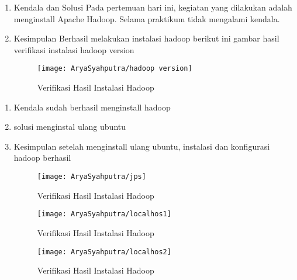 
\begin{enumerate}
\item Kendala dan Solusi
Pada pertemuan hari ini, kegiatan yang dilakukan adalah menginstall Apache Hadoop. Selama praktikum tidak mengalami kendala.

\item Kesimpulan
Berhasil melakukan instalasi hadoop berikut ini gambar hasil verifikasi instalasi hadoop version 

\begin{figure}[!ht]
\texttt{[image: AryaSyahputra/hadoop version]}
\caption{Verifikasi Hasil Instalasi Hadoop}
\label{gam:Hadoop-version}
\end{figure}
\end{enumerate}

\begin{enumerate}
\item Kendala
sudah berhasil menginstall hadoop

\item solusi
menginstal ulang ubuntu

\item Kesimpulan
setelah menginstall ulang ubuntu, instalasi dan konfigurasi hadoop berhasil

\begin{figure}[!ht]
\texttt{[image: AryaSyahputra/jps]}
\caption{Verifikasi Hasil Instalasi Hadoop}
\label{gam:instalasi-hadoop}
\end{figure}
\begin{figure}[!ht]
\texttt{[image: AryaSyahputra/localhos1]}
\caption{Verifikasi Hasil Instalasi Hadoop}
\label{gam:instalasi-hadoop}
\end{figure}
\begin{figure}[!ht]
\texttt{[image: AryaSyahputra/localhos2]}
\caption{Verifikasi Hasil Instalasi Hadoop}
\label{gam:instalasi-hadoop}
\end{figure}
\end{enumerate}

